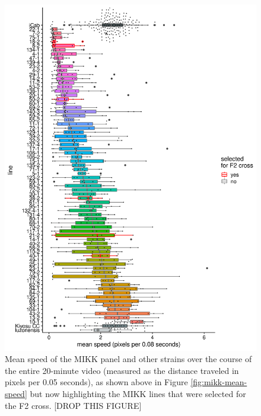 \documentclass[
]{book}
\begin{document}
\begin{figure}
\includegraphics[width=1\linewidth]{figs/mikk_behaviour/line_mean_speed_0.05_selected} \caption{Mean speed of the MIKK panel and other strains over the course of the entire 20-minute video (measured as the distance traveled in pixels per 0.05 seconds), as shown above in Figure \ref{fig:mikk-mean-speed} but now highlighting the MIKK lines that were selected for the F2 cross. {[}DROP THIS FIGURE{]}}\label{fig:F0-line-mean-speed-select}
\end{figure}
\end{document}
